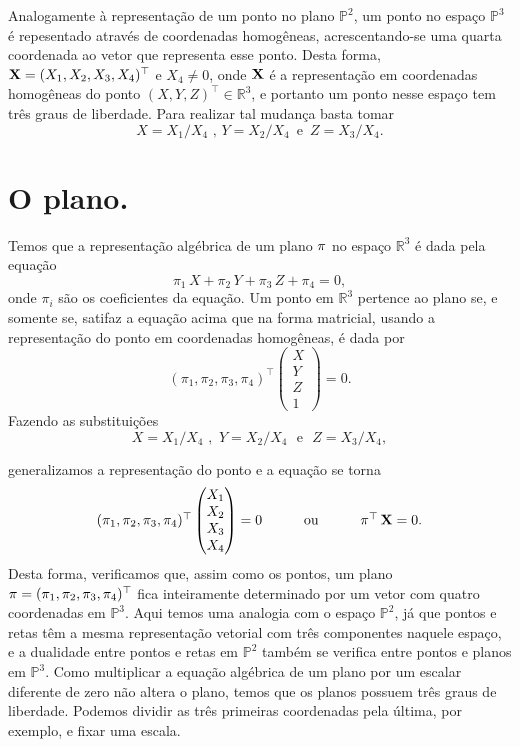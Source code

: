Analogamente à representação de um ponto no plano $\mathbb{P}^2$, um ponto no espaço $\mathbb{P}^3$ é repesentado através de coordenadas homogêneas, acrescentando-se uma quarta coordenada ao vetor que representa esse ponto. Desta forma, $\mathbf{X} = (X_1,X_2,X_3,X_4)^\top$ e $X_4 \ne 0$, onde $\mathbf{X}$ é a representação em coordenadas homogêneas do ponto $(X,Y,Z)^\top \in \mathbb{R}^3$, e portanto um ponto nesse espaço tem três graus de liberdade. Para realizar tal mudança basta tomar 
\begin{equation*}
X=X_1/X_4 \,\, ,\, Y=X_2/X_4 \,\,\, \text{e} \,\,\, Z=X_3/X_4.
\end{equation*}
\section*{O plano.}

Temos que a representação algébrica de um plano $\pi$ no espaço $\mathbb{R}^3$ é dada pela equação
\begin{equation*}
\pi_1\,X+\pi_2\,Y+\pi_3\,Z+\pi_4=0,
\end{equation*}
onde $\pi_i$ são os coeficientes da equação. Um ponto em $\mathbb{R}^3$ pertence ao plano se, e somente se, satifaz a equação acima que na forma matricial, usando a representação do ponto em coordenadas homogêneas, \'e dada por
\begin{equation*}
  (\pi_1,\pi_2,\pi_3,\pi_4)^\top
 \begin{pmatrix}
  X\\
  Y\\
  Z\\
  1
  \end{pmatrix}
 = 0.
\end{equation*}
Fazendo as substituições 
\begin{equation*}
X=X_1/X_4 \,\, , \,\, Y=X_2/X_4 \,\,\,\, \text{e} \,\,\,\, Z=X_3/X_4 ,
\end{equation*}

generalizamos a representação do ponto e a equação se torna
\begin{equation*}
\begin{array}{ccc}
(\pi_1,\pi_2,\pi_3,\pi_4)^\top
  \begin{pmatrix}
  X_1\\
  X_2\\
  X_3\\
  X_4
  \end{pmatrix}
  = 0
& \qquad \text{ou} \qquad
& \pi^\top \, \mathbf{X} = 0.
\end{array}
\end{equation*}
Desta forma, verificamos que, assim como os pontos, um plano $\pi = (\pi_1,\pi_2,\pi_3,\pi_4)^\top$ fica inteiramente determinado por um vetor com quatro coordenadas em $\mathbb{P}^3$. Aqui temos uma analogia com o espaço $\mathbb{P}^2$, já que pontos e retas têm a mesma representação vetorial com três componentes naquele espaço, e a dualidade entre pontos e retas em $\mathbb{P}^2$ também se verifica entre pontos e planos em $\mathbb{P}^3$. Como multiplicar a equação algébrica de um plano por um escalar diferente de zero não altera o plano, temos que os planos possuem três graus de liberdade. Podemos dividir as três primeiras coordenadas pela última, por exemplo, e fixar uma escala.

